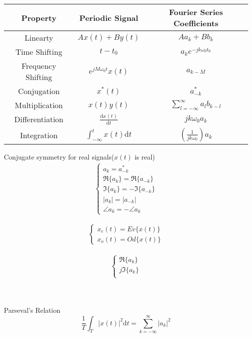 \documentclass[12pt, a4paper]{article}
\begin{document}
\begin{center}
	\begin{tabular} { |c|c c| }
		\hline
		Property & Periodic Signal & Fourier Series Coefficients \\
		\hline
		Linearty & $Ax(t) + By(t)$ & $Aa_k + Bb_k$ \\
		Time Shifting & $t-t_0$ & $a_ke^{-jk\omega_0t_0}$ \\
		Frequency Shifting & $e^{jM\omega_0t}x(t)$ & $a_{k-M}$ \\
		Conjugation & $x^*(t)$ & $a^*_{-k}$ \\
		Multiplication & $x(t)y(t)$ & $\sum_{l=-\infty}^{\infty}a_l b_{k-l}$ \\
		Differentiation & $\frac{\text{d}x(t)}{\text{d}t}$ & $jk\omega_0a_k$ \\
		Integration & $\int_{-\infty}^{t}x(t)\text{d}t$ & $\left(\frac{1}{jk\omega_0}\right)a_k$ \\
		\hline
	\end{tabular}
\end{center}
Conjugate symmetry for real signals($x(t)$ is real)
\begin{align*}
	\begin{cases}
		a_k = a^*_{-k} \\
		\Re \{a_k\} = \Re \{a_{-k}\} \\
		\Im  \{a_k\} = -\Im \{a_{-k}\} \\
		\left|a_k\right| = \left|a_{-k}\right| \\
		\angle a_k = -\angle a_k
	\end{cases}
\end{align*}

\begin{minipage}[t]{0.3 \textwidth}
\begin{align*}
	\begin{cases}
	  x_e(t) = Ev \{x(t)\} \\
		x_o(t) = Od \{x(t)\}
	\end{cases}
\end{align*}
\end{minipage}
\hfill
\begin{minipage}[t]{0.3 \textwidth}
\begin{align*}
	\begin{cases}
		\Re \{a_k\} \\
	  j\Im \{a_k\}	\\
\end{cases}
\end{align*}
\end{minipage}
\\ \\
Parseval's Relation
$$
\frac{1}{T} \int_T \left|x(t)\right|^2 \text{d}t = \sum_{k=-\infty}^{\infty} \left|a_k\right|^2
$$
\newpage
\end{document}
